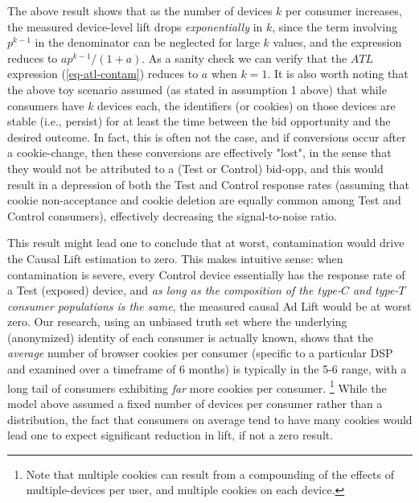 \documentclass[11pt,a4paper]{article}
\theoremstyle{definition}
\theoremstyle{remark}
\theoremstyle{definition}
\theoremstyle{definition}
\theoremstyle{definition}
\theoremstyle{definition}
\theoremstyle{definition}
\theoremstyle{definition}
\begin{document}
The above result shows that as the number of devices $k$ per consumer increases, the measured device-level lift drops \textit{exponentially} in $k$, since the term involving $p^{k-1}$ in the denominator can be neglected for large $k$ values, and the expression reduces to $a p^{k-1}/(1 + a)$. As a sanity check we can verify that the $ATL$ expression (\ref{eq-atl-contam}) reduces to $a$ when $k=1$. It is also worth noting that the above toy scenario assumed (as stated in assumption 1 above) that while consumers have $k$ devices each, the identifiers (or cookies) on those devices are stable (i.e., persist) for at least the time between the bid opportunity and the desired outcome. In fact, this is often not the case, and if conversions occur after a cookie-change, then these conversions are effectively "lost", in the sense that they would not be attributed to a (Test or Control) bid-opp, and this would result in a depression of both the Test and Control response rates (assuming that cookie non-acceptance and cookie deletion are equally common among Test and Control consumers), effectively decreasing the signal-to-noise ratio.

This result might lead one to conclude that at worst, contamination would drive the Causal Lift estimation to zero. 
This makes intuitive sense: when contamination is severe, every Control device essentially has the response rate of a Test (exposed) device, and \textit{as long as the composition of the type-$C$ and type-$T$ consumer populations is the same}, the measured causal Ad Lift would be at worst zero. Our research, using an unbiased truth set where the underlying (anonymized) identity of each consumer is actually known, shows that the {\em average} number of browser cookies per consumer (specific to a particular DSP and examined over a timeframe of 6 months) is typically in the 5-6 range, with a long tail of consumers exhibiting {\em far} more cookies per consumer.
\footnote{Note that multiple cookies can result from a compounding of the effects of multiple-devices per user, and multiple cookies on each device.}
While the model above assumed a fixed number of devices per consumer rather than a distribution, the fact that consumers on average tend to have many cookies would lead one to expect significant reduction in lift, if not a zero result. 
\end{document}
